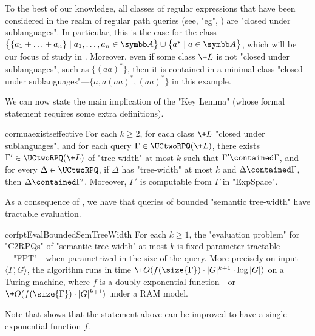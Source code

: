 To the best of our knowledge,
all classes of regular expressions that have been considered in the realm of regular path queries (see, "eg", \cite[\S1]{FigueiraEtal2020Containment}) are "closed under sublanguages". In particular, this is
the case for the class $\bigl\{ \{a_1+\dotsc+a_n\} \mid a_1,\dotsc,a_n
\in \A \bigr\} \cup \bigl\{ a^* \mid a \in \A \bigr\}$, which will be our focus of study in . Moreover, even if some class $\+L$
is not "closed under sublanguages", such as $\{(aa)^*\}$,
then it is contained in a minimal class "closed under sublanguages"---$\{a, a(aa)^*, (aa)^*\}$ in 
this example.

We can now state the main implication of the "Key Lemma" (whose formal statement requires some extra definitions).
\begin{restatable*}{cor}{muaexistseffective}
    \AP\label{cor:mua-exists-effective}
    For each $k \geq 2$, for each class $\+L$ "closed under sublanguages",
    and for each query $\Gamma \in \UCtwoRPQ(\+L)$,
    there exists $\Gamma' \in \UCtwoRPQ(\+L)$ of "tree-width" at most $k$ 
    such that
    $\Gamma' \contained \Gamma$, and for every $\Delta \in \UCtwoRPQ$, if $\Delta$ has
    "tree-width" at most $k$ and $\Delta \contained \Gamma$, then $\Delta \contained \Gamma'$.
    Moreover, $\Gamma'$ is computable from $\Gamma$ in "ExpSpace".
\end{restatable*}

As a consequence of , we have that queries of bounded "semantic tree-width" have tractable evaluation.
\begin{restatable*}{cor}{fptEvalBoundedSemTreeWidth}
	\AP\label{coro:fpt-eval-bounded-semtreewidth}
	For each $k\geq 1$, the "evaluation problem" for "C2RPQs" of "semantic tree-width"
	at most $k$ is fixed-parameter tractable---"FPT"---when parametrized in the size of
	the query. More precisely on input $\langle \Gamma, G \rangle$,
	the algorithm runs in time
	$\+O(f(\size{\Gamma})\cdot |G|^{k+1} \cdot \log{|G|})$ on a Turing machine, where $f$ is a doubly-exponential function---or $\+O(f(\size{\Gamma})\cdot |G|^{k+1})$ under a RAM model.
\end{restatable*}
Note that \cite[Theorem~22]{FeierGogaczMurlak24Treewidth} shows that the statement above can be improved to have a single-exponential function $f$.

